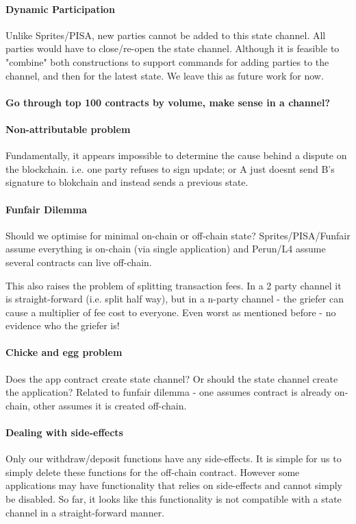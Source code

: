 \documentclass{llncs}
\begin{document}
\paragraph{Dynamic Participation} Unlike Sprites/PISA, new parties cannot be added to this state channel. All parties would have to close/re-open the state channel. Although it is feasible to "combine" both constructions to support commands for adding parties to the channel, and then for the latest state. We leave this as future work for now. 

\paragraph{Go through top 100 contracts by volume, make sense in a channel?} 
\paragraph{Non-attributable problem} Fundamentally, it appears impossible to determine the cause behind a dispute on the blockchain. i.e. one party refuses to sign update; or A just doesnt send B's signature to blokchain and instead sends a previous state.

\paragraph{Funfair Dilemma} Should we optimise for minimal on-chain or off-chain state? Sprites/PISA/Funfair assume everything is on-chain (via single application) and Perun/L4 assume several contracts can live off-chain. 

This also raises the problem of splitting transaction fees. In a 2 party channel it is straight-forward (i.e. split half way), but in a n-party channel - the griefer can cause a multiplier of fee cost to everyone. Even worst as mentioned before - no evidence who the griefer is! 

\paragraph{Chicke and egg problem} Does the app contract create state channel? Or should the state channel create the application? Related to funfair dilemma - one assumes contract is already on-chain, other assumes it is created off-chain. 

\paragraph{Dealing with side-effects} 
Only our withdraw/deposit functions have any side-effects. It is simple for us to simply delete these functions for the off-chain contract. However some applications may have functionality that relies on side-effects and cannot simply be disabled. So far, it looks like this functionality is not compatible with a state channel in a straight-forward manner. 
\end{document}
